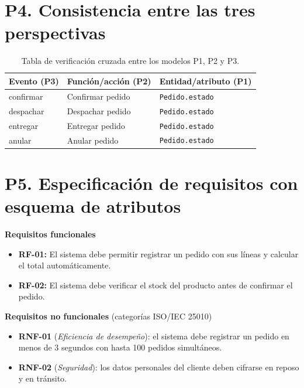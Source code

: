 \documentclass[12pt,letterpaper]{article}
\begin{document}
\section*{P4. Consistencia entre las tres perspectivas}

\begin{table}[H]
\centering
\caption{Tabla de verificación cruzada entre los modelos P1, P2 y P3.}
\label{tab:cruzada}
\begin{tabular}{|l|l|l|}
\hline
\textbf{Evento (P3)} & \textbf{Función/acción (P2)} & \textbf{Entidad/atributo (P1)} \\
\hline
confirmar & Confirmar pedido & \texttt{Pedido.estado} \\
\hline
despachar & Despachar pedido & \texttt{Pedido.estado} \\
\hline
entregar  & Entregar pedido  & \texttt{Pedido.estado} \\
\hline
anular    & Anular pedido    & \texttt{Pedido.estado} \\
\hline
\end{tabular}
\end{table}

\section*{P5. Especificación de requisitos con esquema de atributos}

\textbf{Requisitos funcionales}
\begin{itemize}[leftmargin=*,itemsep=3pt]
  \item \textbf{RF-01:} El sistema debe permitir registrar un pedido con sus
        líneas y calcular el total automáticamente.
  \item \textbf{RF-02:} El sistema debe verificar el stock del producto antes de
        confirmar el pedido.
\end{itemize}

\textbf{Requisitos no funcionales} (categorías ISO/IEC 25010)
\begin{itemize}[leftmargin=*,itemsep=3pt]
  \item \textbf{RNF-01} (\textit{Eficiencia de desempeño}): el sistema debe
        registrar un pedido en menos de 3 segundos con hasta 100 pedidos
        simultáneos.
  \item \textbf{RNF-02} (\textit{Seguridad}): los datos personales del cliente
        deben cifrarse en reposo y en tránsito.
\end{itemize}
\end{document}
